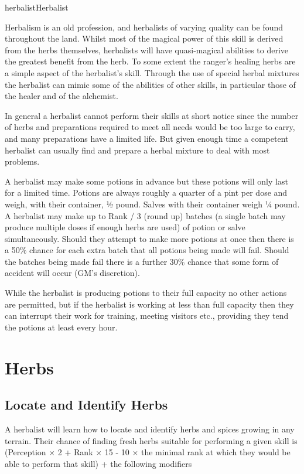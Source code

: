 \begin{Skill}[1.1]{herbalist}{Herbalist}

Herbalism is an old profession, and herbalists of varying quality can
be found throughout the land.  Whilst most of the magical power of
this skill is derived from the herbs themselves, herbalists will have
quasi-magical abilities to derive the greatest benefit from the
herb. To some extent the ranger’s healing herbs are a simple aspect of
the herbalist’s skill.  Through the use of special herbal mixtures the
herbalist can mimic some of the abilities of other skills, in
particular those of the healer and of the alchemist.

In general a herbalist cannot perform their skills at short notice
since the number of herbs and preparations required to meet all needs
would be too large to carry, and many preparations have a limited
life. But given enough time a competent herbalist can usually find and
prepare a herbal mixture to deal with most problems.

A herbalist may make some potions in advance but these potions will
only last for a limited time.  Potions are always roughly a quarter of
a pint per dose and weigh, with their container, ½ pound.  Salves with
their container weigh ¼ pound.  A herbalist may make up to Rank / 3
(round up) batches (a single batch may produce multiple doses if
enough herbs are used) of potion or salve simultaneously.  Should they
attempt to make more potions at once then there is a 50\% chance for
each extra batch that all potions being made will fail.  Should the
batches being made fail there is a further 30\% chance that some form
of accident will occur (GM’s discretion).

While the herbalist is producing potions to their full capacity no
other actions are permitted, but if the herbalist is working at less
than full capacity then they can interrupt their work for training,
meeting visitors etc., providing they tend the potions at least every
hour.

\section{Herbs}

\subsection{Locate and Identify Herbs}

A herbalist will learn how to locate and identify herbs and spices
growing in any terrain.  Their chance of finding fresh herbs suitable
for performing a given skill is (Perception × 2 + Rank × 15 - 10 ×
the minimal rank at which they would be able to perform that skill) +
the following modifiers


\end{Skill}
